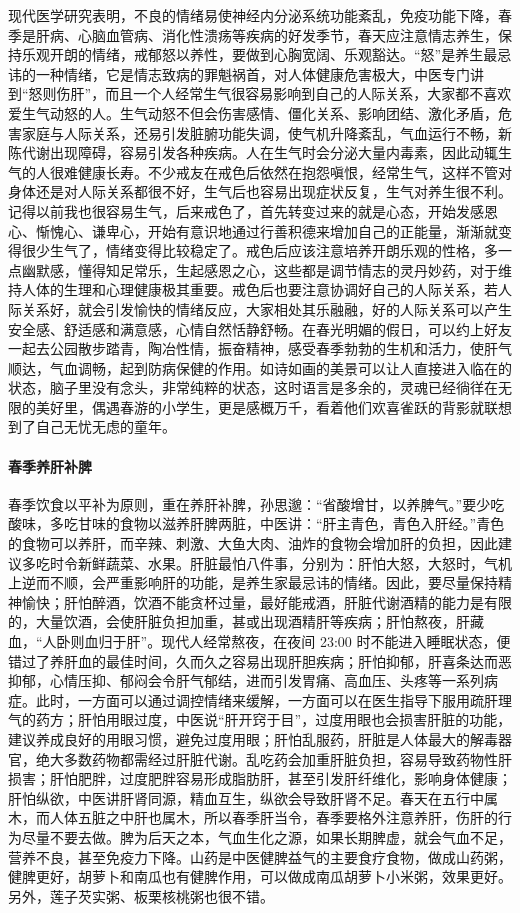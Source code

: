 现代医学研究表明，不良的情绪易使神经内分泌系统功能紊乱，免疫功能下降，春季是肝病、心脑血管病、消化性溃疡等疾病的好发季节，春天应注意情志养生，保持乐观开朗的情绪，戒郁怒以养性，要做到心胸宽阔、乐观豁达。“怒”是养生最忌讳的一种情绪，它是情志致病的罪魁祸首，对人体健康危害极大，中医专门讲到“怒则伤肝”，而且一个人经常生气很容易影响到自己的人际关系，大家都不喜欢爱生气动怒的人。生气动怒不但会伤害感情、僵化关系、影响团结、激化矛盾，危害家庭与人际关系，还易引发脏腑功能失调，使气机升降紊乱，气血运行不畅，新陈代谢出现障碍，容易引发各种疾病。人在生气时会分泌大量内毒素，因此动辄生气的人很难健康长寿。不少戒友在戒色后依然在抱怨嗔恨，经常生气，这样不管对身体还是对人际关系都很不好，生气后也容易出现症状反复，生气对养生很不利。记得以前我也很容易生气，后来戒色了，首先转变过来的就是心态，开始发感恩心、惭愧心、谦卑心，开始有意识地通过行善积德来增加自己的正能量，渐渐就变得很少生气了，情绪变得比较稳定了。戒色后应该注意培养开朗乐观的性格，多一点幽默感，懂得知足常乐，生起感恩之心，这些都是调节情志的灵丹妙药，对于维持人体的生理和心理健康极其重要。戒色后也要注意协调好自己的人际关系，若人际关系好，就会引发愉快的情绪反应，大家相处其乐融融，好的人际关系可以产生安全感、舒适感和满意感，心情自然恬静舒畅。在春光明媚的假日，可以约上好友一起去公园散步踏青，陶冶性情，振奋精神，感受春季勃勃的生机和活力，使肝气顺达，气血调畅，起到防病保健的作用。如诗如画的美景可以让人直接进入临在的状态，脑子里没有念头，非常纯粹的状态，这时语言是多余的，灵魂已经徜徉在无限的美好里，偶遇春游的小学生，更是感概万千，看着他们欢喜雀跃的背影就联想到了自己无忧无虑的童年。

\paragraph{春季养肝补脾}

春季饮食以平补为原则，重在养肝补脾，孙思邈：“省酸增甘，以养脾气。”要少吃酸味，多吃甘味的食物以滋养肝脾两脏，中医讲：“肝主青色，青色入肝经。”青色的食物可以养肝，而辛辣、刺激、大鱼大肉、油炸的食物会增加肝的负担，因此建议多吃时令新鲜蔬菜、水果。肝脏最怕八件事，分别为：肝怕大怒，大怒时，气机上逆而不顺，会严重影响肝的功能，是养生家最忌讳的情绪。因此，要尽量保持精神愉快；肝怕醉酒，饮酒不能贪杯过量，最好能戒酒，肝脏代谢酒精的能力是有限的，大量饮酒，会使肝脏负担加重，甚或出现酒精肝等疾病；肝怕熬夜，肝藏血，“人卧则血归于肝”。现代人经常熬夜，在夜间 23:00 时不能进入睡眠状态，便错过了养肝血的最佳时间，久而久之容易出现肝胆疾病；肝怕抑郁，肝喜条达而恶抑郁，心情压抑、郁闷会令肝气郁结，进而引发胃痛、高血压、头疼等一系列病症。此时，一方面可以通过调控情绪来缓解，一方面可以在医生指导下服用疏肝理气的药方；肝怕用眼过度，中医说“肝开窍于目”，过度用眼也会损害肝脏的功能，建议养成良好的用眼习惯，避免过度用眼；肝怕乱服药，肝脏是人体最大的解毒器官，绝大多数药物都需经过肝脏代谢。乱吃药会加重肝脏负担，容易导致药物性肝损害；肝怕肥胖，过度肥胖容易形成脂肪肝，甚至引发肝纤维化，影响身体健康；肝怕纵欲，中医讲肝肾同源，精血互生，纵欲会导致肝肾不足。春天在五行中属木，而人体五脏之中肝也属木，所以春季肝当令，春季要格外注意养肝，伤肝的行为尽量不要去做。脾为后天之本，气血生化之源，如果长期脾虚，就会气血不足，营养不良，甚至免疫力下降。山药是中医健脾益气的主要食疗食物，做成山药粥，健脾更好，胡萝卜和南瓜也有健脾作用，可以做成南瓜胡萝卜小米粥，效果更好。另外，莲子芡实粥、板栗核桃粥也很不错。

